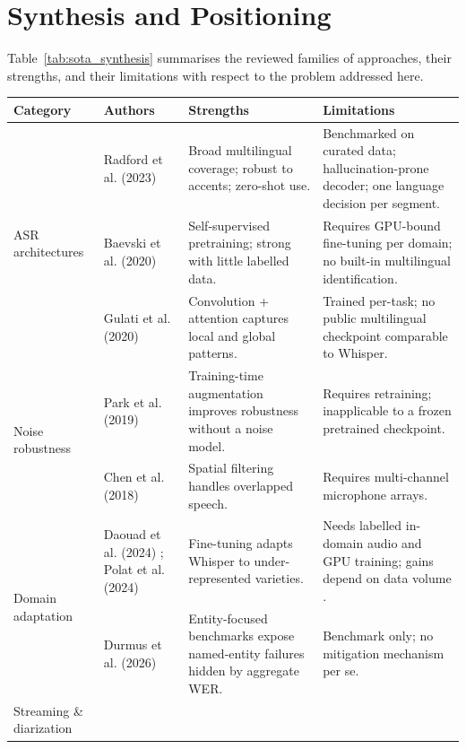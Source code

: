 \documentclass[12pt]{report}
\begin{document}
\section{Synthesis and Positioning}
Table~\ref{tab:sota_synthesis} summarises the reviewed families of approaches, their strengths, and their limitations with respect to the problem addressed here.
\begin{table}[htbp]
\centering
\footnotesize
\renewcommand{\arraystretch}{1.2}
\begin{tabular}{|p{2.2cm}|p{2.8cm}|p{4.4cm}|p{4.6cm}|}
\hline
\textbf{Category} & \textbf{Authors} & \textbf{Strengths} & \textbf{Limitations} \\ \hline
\multirow{3}{2.2cm}{ASR architectures}
& Radford et al. (2023) \cite{radford2023robust}
& Broad multilingual coverage; robust to accents; zero-shot use.
& Benchmarked on curated data; hallucination-prone decoder; one language decision per segment. \\ \cline{2-4}
& Baevski et al. (2020) \cite{baevski2020wav2vec}
& Self-supervised pretraining; strong with little labelled data.
& Requires GPU-bound fine-tuning per domain; no built-in multilingual identification. \\ \cline{2-4}
& Gulati et al. (2020) \cite{gulati2020conformer}
& Convolution + attention captures local and global patterns.
& Trained per-task; no public multilingual checkpoint comparable to Whisper. \\ \hline
\multirow{2}{2.2cm}{Noise robustness}
& Park et al. (2019) \cite{park2019specaugment}
& Training-time augmentation improves robustness without a noise model.
& Requires retraining; inapplicable to a frozen pretrained checkpoint. \\ \cline{2-4}
& Chen et al. (2018) \cite{chen2018multi}
& Spatial filtering handles overlapped speech.
& Requires multi-channel microphone arrays. \\ \hline
\multirow{2}{2.2cm}{Domain adaptation}
& Daouad et al. (2024) \cite{daouad2024optimizing}; Polat et al. (2024) \cite{polat2024implementation}
& Fine-tuning adapts Whisper to under-represented varieties.
& Needs labelled in-domain audio and GPU training; gains depend on data volume \cite{whisperfinetune2024}. \\ \cline{2-4}
& Durmus et al. (2026) \cite{durmus2026contextual}
& Entity-focused benchmarks expose named-entity failures hidden by aggregate WER.
& Benchmark only; no mitigation mechanism per se. \\ \hline
\multirow{2}{2.2cm}{Streaming \& diarization}

\end{tabular}
\end{table}
\end{document}
